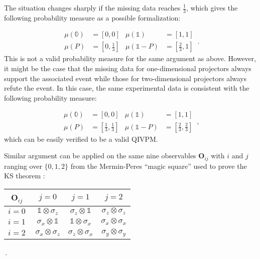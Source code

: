 \documentclass[english,reprint, aps, prl,superscriptaddress, showpacs,
showkeys, longbibliography, amsmath, amssymb, floatfix]{revtex4-1}
\theoremstyle{plain}
\theoremstyle{definition}
\newcommand{\imposs}{\ensuremath{\left[0,0\right]}}
\newcommand{\necess}{\ensuremath{\left[1,1\right]}}
\begin{document}
The situation changes sharply if the missing data reaches $\frac{1}{3}$,
which gives the following probability measure as a possible formalization:

\begin{equation}
\begin{aligned}\mu\left(\mathbb{0}\right) & =\imposs & \mu\left(\mathbb{1}\right) & =\necess\\
\mu\left(P\right) & =\left[0,\tfrac{1}{3}\right] & \mu\left(\mathbb{1}-P\right) & =\left[\tfrac{2}{3},1\right]
\end{aligned}
\,.
\end{equation}
This is not a valid probability measure for the same argument as above.
However, it might be the case that the missing data for one-dimensional
projectors always support the associated event while those for two-dimensional
projectors always refute the event. In this case, the same experimental
data is consistent with the following probability measure:

\begin{equation}
\begin{aligned}\mu\left(\mathbb{0}\right) & =\imposs & \mu\left(\mathbb{1}\right) & =\necess\\
\mu\left(P\right) & =\left[\tfrac{1}{3},\tfrac{1}{3}\right] & \mu\left(\mathbb{1}-P\right) & =\left[\tfrac{2}{3},\tfrac{2}{3}\right]
\end{aligned}
\,,
\end{equation}
which can be easily verified to be a valid QIVPM.

Similar argument can be applied on the same nine observables $\mathbf{O}_{ij}$
with $i$ and $j$ ranging over $\{0,1,2\}$ from the Mermin-Peres
``magic square'' used to prove the KS theorem \cite{Mermin1990Simple,peres1995quantum,Griffiths2003}:


{\renewcommand{\arraystretch}{2}%
\begin{center} 
\begin{tabular}{r|@{\quad}c@{\quad}|@{\quad}c@{\quad}|@{\quad}c@{\quad}|} 
$\mathbf{O}_{ij}$~ & $j=0$ & $j=1$ & $j=2$ \\ 
\hline  
$i=0~$ & $\mathbb{1}\otimes\sigma_{z}$  & $\sigma_{z}\otimes\mathbb{1}$  & $\sigma_{z}\otimes\sigma_{z}$ \tabularnewline 
\hline  
$i=1~$ & $\sigma_{x}\otimes\mathbb{1}$  & $\mathbb{1}\otimes\sigma_{x}$  & $\sigma_{x}\otimes\sigma_{x}$ \tabularnewline 
\hline  
$i=2~$ & $\sigma_{x}\otimes\sigma_{z}$  & $\sigma_{z}\otimes\sigma_{x}$  & $\sigma_{y}\otimes\sigma_{y}$ \tabularnewline 
\hline  
\end{tabular}\,.
\par\end{center} 
}
\end{document}
